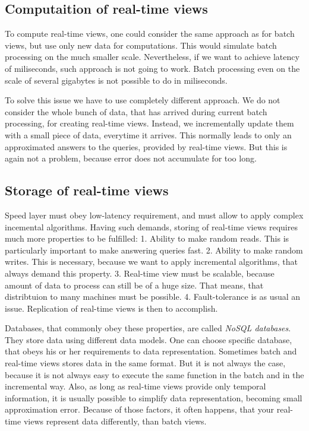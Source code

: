\subsection{Computaition of real-time views}
To compute real-time views, one could consider the same approach as for batch
views, but use only new data for computations.
This would simulate batch processing on the much smaller scale.
Nevertheless, if we want to achieve latency of miliseconds, such approach is
not going to work.
Batch processing even on the scale of several gigabytes is not possible to do in
miliseconds.

To solve this issue we have to use completely different approach.
We do not consider the whole bunch of data, that has arrived during current
batch processing, for creating real-time views.
Instead, we incrementally update them with a small piece of data, everytime it
arrives.
This normally leads to only an approximated answers to the queries, provided by
real-time views.
But this is again not a problem, because error does not accumulate for too long.

\subsection{Storage of real-time views}
Speed layer must obey low-latency requirement, and must allow to apply complex
incemental algorithms.
Having such demands, storing of real-time views requires much more properties
to be fulfilled:
1. Ability to make random reads. This is particularly important to make
answering queries fast.
2. Ability to make random writes. This is necessary, because we want to apply
incremental algorithms, that always demand this property.
3. Real-time view must be scalable, because amount of data to process can still
be of a huge size. That means, that distribtuion to many machines must be
possible.
4. Fault-tolerance is as usual an issue. Replication of real-time views is then
to accomplish.

Databases, that commonly obey these properties, are called \textit{NoSQL databases}.
They store data using different data models.
One can choose specific database, that obeys his or her requirements to data
representation.
Sometimes batch and real-time views stores data in the same format.
But it is not always the case, because it is not always easy to execute the
same function in the batch and in the incremental way.
Also, as long as real-time views provide only temporal information, it is
usually possible to simplify data representation, becoming small approximation
error.
Because of those factors, it often happens, that your real-time views represent
data differently, than batch views.

